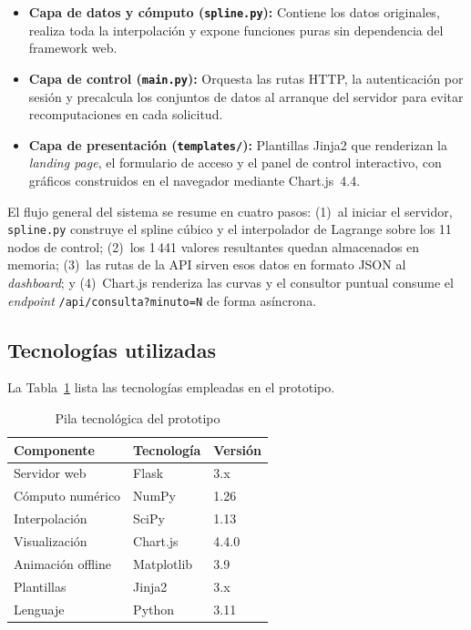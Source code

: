 \documentclass[conference]{IEEEtran}
\begin{document}
\begin{itemize}
    \item \textbf{Capa de datos y cómputo (\texttt{spline.py}):} Contiene los datos originales, realiza toda la interpolación y expone funciones puras sin
      dependencia del framework web.

    \item \textbf{Capa de control (\texttt{main.py}):} Orquesta las rutas HTTP, la autenticación por sesión y precalcula los conjuntos de datos al
      arranque del servidor para evitar recomputaciones en cada solicitud.

    \item \textbf{Capa de presentación (\texttt{templates/}):} Plantillas Jinja2 que renderizan la \textit{landing page}, el formulario de acceso y el
      panel de control interactivo, con gráficos construidos en el navegador mediante Chart.js~4.4.
\end{itemize}

El flujo general del sistema se resume en cuatro pasos: (1)~al iniciar el servidor, \texttt{spline.py} construye el spline cúbico y el interpolador de
Lagrange sobre los 11 nodos de control; (2)~los 1\,441 valores resultantes quedan almacenados en memoria; (3)~las rutas de la API sirven esos datos en
formato JSON al \textit{dashboard}; y (4)~Chart.js renderiza las curvas y el consultor puntual consume el \textit{endpoint}
\texttt{/api/consulta?minuto=N} de forma asíncrona.

\subsection{Tecnologías utilizadas}

La Tabla~\ref{tab:tecnologias} lista las tecnologías empleadas en el prototipo.

\begin{table}[h] \caption{Pila tecnológica del prototipo} \label{tab:tecnologias} \centering \begin{tabular}{lll}
\toprule
\textbf{Componente} & \textbf{Tecnología} & \textbf{Versión} \\
\midrule
Servidor web       & Flask          & 3.x     \\
Cómputo numérico   & NumPy          & 1.26    \\
Interpolación      & SciPy          & 1.13    \\
Visualización      & Chart.js       & 4.4.0   \\
Animación offline  & Matplotlib     & 3.9     \\
Plantillas         & Jinja2         & 3.x     \\
Lenguaje           & Python         & 3.11    \\
\bottomrule
\end{tabular}
\end{table}
\end{document}
